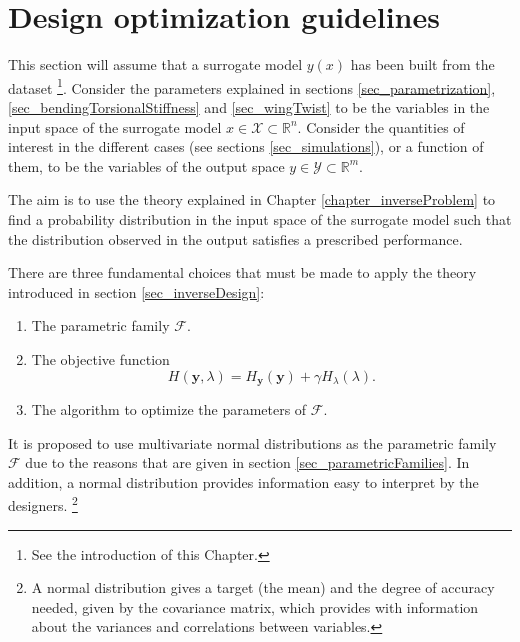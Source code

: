 \section{Design optimization guidelines} \label{sec_designOptimizationGuidelines}
This section will assume that a surrogate model $y(x)$ has been built from the dataset
\footnote{See the introduction of this Chapter.}.
Consider the parameters explained in sections \ref{sec_parametrization}, \ref{sec_bendingTorsionalStiffness} and \ref{sec_wingTwist} to be the variables in the input space of the surrogate model $x\in\mathcal{X}\subset\mathbb{R}^n$.
Consider the quantities of interest in the different cases (see sections \ref{sec_simulations}), or a function of them, to be the variables of the output space $y\in\mathcal{Y}\subset\mathbb{R}^m$. 

The aim is to use the theory explained in Chapter \ref{chapter_inverseProblem} to find a probability distribution in the input space of the surrogate model such that the distribution observed in the output satisfies a prescribed performance.

There are three fundamental choices that must be made to apply the theory introduced in section \ref{sec_inverseDesign}: 
\begin{enumerate}
\item The parametric family $\mathcal{F}$.
\item The objective function 
\begin{equation} \label{eq_objectiveFuntionAirbus}
  H(\pmb{y},\lambda) = H_{\pmb{y}}(\pmb{y}) + \gamma H_{\lambda}(\lambda).
\end{equation}
\item The algorithm to optimize the parameters of $\mathcal{F}$.
\end{enumerate}

It is proposed to use multivariate normal distributions as the parametric family $\mathcal{F}$ due to the reasons that are given in section \ref{sec_parametricFamilies}. In addition, a normal distribution provides information easy to interpret by the designers.
\footnote{A normal distribution gives a target (the mean) and the degree of accuracy needed, given by the covariance matrix, which provides with information about the variances and correlations between variables.}

